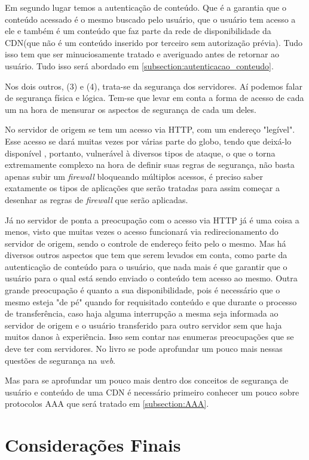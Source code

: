 Em segundo lugar temos a autentica\c{c}\~ao de conte\'udo. Que \'e a garantia que o conte\'udo acessado \'e o mesmo buscado pelo usu\'ario, que o usu\'ario tem acesso a ele e tamb\'em \'e um conte\'udo que faz parte da rede de disponibilidade da CDN(que n\~ao \'e um conte\'udo inserido por terceiro sem autoriza\c{c}\~ao pr\'evia). Tudo isso tem que ser minuciosamente tratado e averiguado antes de retornar ao usu\'ario. Tudo isso ser\'a abordado em \ref{subsection:autenticacao_conteudo}.

Nos dois outros, (3) e (4), trata-se da seguran\c{c}a dos servidores. A\'i podemos falar de seguran\c{c}a f\'isica e l\'ogica. Tem-se que levar em conta a forma de acesso de cada um na hora de mensurar os aspectos de seguran\c{c}a de cada um deles. 

No servidor de origem se tem um acesso via HTTP, com um endereço "leg\'ivel". Esse acesso se dar\'a muitas vezes por v\'arias parte do globo, tendo que deix\'a-lo dispon\'ivel , portanto, vulner\'avel \`a diversos tipos de ataque, o que o torna extremamente complexo na hora de definir suas regras de seguran\c{c}a, n\~ao basta apenas subir um \textit{firewall} bloqueando m\'ultiplos acessos, \'e preciso saber exatamente os tipos de aplica\c{c}\~oes que ser\~ao tratadas para assim come\c{c}ar a desenhar as regras de \textit{firewall} que ser\~ao aplicadas.

J\'a no servidor de ponta a preocupa\c{c}\~ao com o acesso via HTTP j\'a \'e uma coisa a menos, visto que muitas vezes o acesso funcionar\'a via redirecionamento do servidor de origem, sendo o controle de endere\c{c}o feito pelo o mesmo. Mas h\'a diversos outros aspectos que tem que serem levados em conta, como parte da autentica\c{c}\~ao de conte\'udo para o usu\'ario, que nada mais \'e que garantir que o usu\'ario para o qual est\'a sendo enviado o conte\'udo tem acesso ao mesmo. Outra grande preocupa\c{c}\~ao \'e quanto a sua disponibilidade, pois \'e necess\'ario que o mesmo esteja "de p\'e" quando for requisitado conte\'udo e que durante o processo de transfer\^encia, caso haja alguma interrup\c{c}\~ao a mesma seja informada ao servidor de origem e o usu\'ario transferido para outro servidor sem que haja muitos danos \`a experi\^encia. Isso sem contar nas enumeras preocupa\c{c}\~oes que se deve ter com servidores. No livro \cite{stallings1995network} se pode aprofundar um pouco mais nessas quest\~oes de segurança na \textit{web}.

Mas para se aprofundar um pouco mais dentro dos conceitos de seguran\c{c}a de usu\'ario e conte\'udo de uma CDN \'e necess\'ario primeiro conhecer um pouco sobre protocolos AAA que ser\'a tratado em \ref{subsection:AAA}.





\section{Considerações Finais}